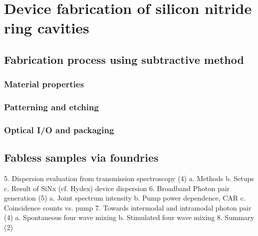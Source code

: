 
\chapter{Device fabrication of silicon nitride ring cavities}


\section{Fabrication process using subtractive method}

\subsection{Material properties}
\subsection{Patterning and etching}
\subsection{Optical I/O and packaging}

\section{Fabless samples via foundries}


5.	Dispersion evaluation from transmission spectroscopy (4)
a.	Methods
b.	Setups
c.	Result of SiNx (cf. Hydex) device dispersion
6.	Broadband Photon pair generation (5)
a.	Joint spectrum intensity
b.	Pump power dependence, CAR
c.	Coincidence counts vs. pump
7.	Towards intermodal and intramodal photon pair (4)
a.	Spontaneous four wave mixing
b.	Stimulated four wave mixing
8.	Summary (2) 
